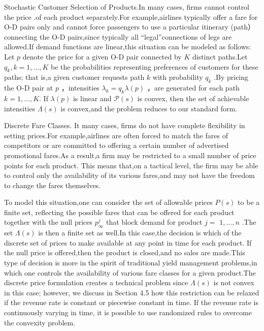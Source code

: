 Stochastic Customer Selection of Products.In many cases, firms cannot
control the price .of each product separately.For example,airlines
typically offer a fare for O-D pairs only and cannot force passengers to
use a particular itinerary (path） connecting the O-D pairs,since
typically all ``legal''connections of legs are allowed.If demand
functions are linear,this situation can be modeled as follows: Let \(p\)
denote the price for a given O-D pair connected by \(K\) distinct
paths.Let \(q _ { k } , k = 1 , \ldots , K\) be the probabilities
representing preferences of customers for these paths; that is,a given
customer requests path \(k\) with probability \(q _ { k }\) .By pricing
the O-D pair at \(p\) ，intensities
\(\lambda _ { k } = q _ { k } \lambda ( p )\) ，are generated for each
path \(k = 1 , \ldots , K .\) If \(\lambda ( p )\) is linear and
\(\mathcal { P } ( s )\) is convex, then the set of achievable
intensities \(\Lambda ( s )\) is convex,and the problem reduces to our
standard form.

Discrete Fare Classes. It many cases, firms do not have complete
flexibility in setting prices.For example,airlines are often forced to
match the fares of competitors or are committed to offering a certain
number of advertised promotional fares.As a result,a firm may be
restricted to a small number of price points for each product. This
means that,on a tactical level, the firm may be able to control only the
availability of its various fares,and may not have the freedom to change
the fares themselves.

To model this situation,one can consider the set of allowable prices
\(P ( s )\) to be a finite set, reflecting the possible fares that can
be offered for each product together with the null prices
\(p _ { \infty } ^ { j }\) that block demand for product \(j =\)
\(1 , \ldots , n\) .The set \(\Lambda ( s )\) is then a finite set as
well.In this case,the decision is which of the discrete set of prices to
make available at any point in time for each product. If the null price
is offered,then the product is closed,and no sales are made.This type of
decision is more in the spirit of traditional yield management
problems,in which one controls the availability of various fare classes
for a given product.The discrete price formulation creates a technical
problem since \(\Lambda ( s )\) is not convex in this case; however, we
discuss in Section 4.5 how this restriction can be relaxed if the
revenue rate is constant or piecewise constant in time. If the revenue
rate is continuously varying in time, it is possible to use randomized
rules to overcome the convexity problem.

